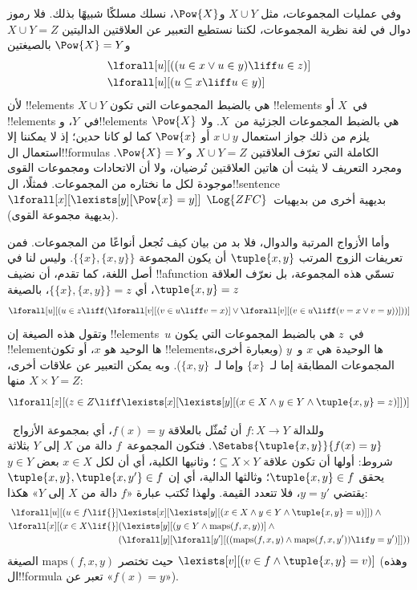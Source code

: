 \documentclass[../../../include/open-logic-section]{subfiles}
\begin{document}
وفي عمليات المجموعات، مثل $X \cup Y$ و$\Pow{X}$، نسلك
مسلكًا شبيهًا بذلك. فلا رموز دوال في لغة نظرية المجموعات، لكننا
نستطيع التعبير عن العلاقتين الداليتين $X \cup Y = Z$ و$\Pow{X} = Y$
بالصيغتين
\begin{align*}
& \lforall[u][((u \in x \lor u \in y) \liff u \in z)]\\
& \lforall[u][(u \subseteq x \liff u \in y )]
\end{align*}
لأن !!{element}s $X \cup Y$ هي بالضبط المجموعات التي تكون
!!{element}s في~$X$ أو !!{element}s في~$Y$، و!!{element}s
$\Pow{X}$ هي بالضبط المجموعات الجزئية من~$X$. ولا يلزم من ذلك جواز
استعمال $x \cup y$ أو $\Pow{x}$ كما لو كانا حدين؛ إذ لا يمكننا إلا
استعمال ال!!{formula}s الكاملة التي تعرّف العلاقتين $X \cup Y = Z$
و$\Pow{X} = Y$. ومجرد التعريف لا يثبت أن هاتين العلاقتين تُرضيان، ولا أن الاتحادات
ومجموعات القوى موجودة لكل ما نختاره من المجموعات. فمثلًا،
ال!!{sentence} $\lforall[x][\lexists[y][\Pow{x} = y]]$ بديهية أخرى
من بديهيات~$\Log{ZFC}$ (بديهية مجموعة القوى).

وأما الأزواج المرتبة والدوال، فلا بد من بيان كيف تُجعل أنواعًا
من المجموعات. فمن تعريفات الزوج المرتب $\tuple{x, y}$ أن يكون
المجموعة $\{\{x\}, \{x, y\}\}$. وليس لنا في أصل اللغة، كما
تقدم، أن نضيف !!a{function} تسمّي هذه المجموعة، بل نعرّف العلاقة
$\tuple{x, y} = z$، أي $\{\{x\}, \{x, y\}\} = z$، بالصيغة
\[
\lforall[u][(u \in z \liff (\lforall[v][(v \in u \liff v = x)] \lor
  \lforall[v][(v \in u \liff (v = x \lor v = y))]))]
\]
وتقول هذه الصيغة إن !!{element}s~$u$ في~$z$ هي بالضبط المجموعات التي
يكون !!{element}ها الوحيد هو $x$، أو تكون !!{element}sها الوحيدة هي
$x$ و~$y$ (وبعبارة
أخرى، المجموعات المطابقة إما لـ~$\{x\}$ وإما لـ~$\{x, y\}$). وبه
يمكن التعبير عن علاقات أخرى، منها $X \times Y = Z$:
\[
\lforall[z][(z \in Z \liff \lexists[x][\lexists[y][(x \in
        X \land y \in Y \land \tuple{x, y} = z)]])]
\]

وللدالة $f \colon X \to Y$ أن تُمثّل بالعلاقة $f(x)
= y$، أي بمجموعة الأزواج~$\Setabs{\tuple{x,y}}{f(x) = y}$.
فتكون المجموعة~$f$ دالة من $X$ إلى $Y$ بثلاثة شروط: أولها أن
تكون علاقة $\subseteq X \times Y$؛ وثانيها الكلية، أي أن لكل
$x \in X$ بعض $y \in Y$ يحقق $\tuple{x, y} \in f$؛
وثالثها الدالية، أي إن $\tuple{x, y}, \tuple{x, y'} \in f$
يقتضي $y = y'$، فلا تتعدد القيمة. ولهذا تُكتب عبارة «$f$ دالة
من $X$ إلى $Y$» هكذا:
\begin{align*}
 \lforall[u][(u \in f \lif {}] & \lexists[x][\lexists[y][(x \in X \land y \in
      Y \land \tuple{x, y} = u)]]) \land {}\\
 \lforall[x][(x \in X \lif {}] &
      (\lexists[y][(y \in Y \land \mathrm{maps}(f, x, y))] \land {}\\
& (\lforall[y][\lforall[y'][((\mathrm{maps}(f, x, y) \land
    \mathrm{maps}(f, x, y')) \lif y = y')]]))
\end{align*}
حيث تختصر $\mathrm{maps}(f, x, y)$ الصيغة $\lexists[v][(v \in f \land
  \tuple{x, y} = v)]$ (وهذه ال!!{formula} تعبر عن «$f(x) = y$»).
\end{document}
